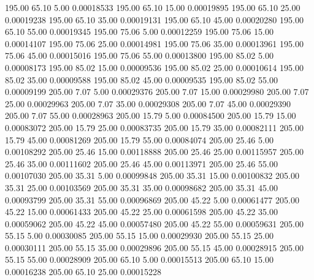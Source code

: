     195.00     65.10      5.00     0.00018533
    195.00     65.10     15.00     0.00019895
    195.00     65.10     25.00     0.00019238
    195.00     65.10     35.00     0.00019131
    195.00     65.10     45.00     0.00020280
    195.00     65.10     55.00     0.00019345
    195.00     75.06      5.00     0.00012259
    195.00     75.06     15.00     0.00014107
    195.00     75.06     25.00     0.00014981
    195.00     75.06     35.00     0.00013961
    195.00     75.06     45.00     0.00015016
    195.00     75.06     55.00     0.00013800
    195.00     85.02      5.00     0.00008173
    195.00     85.02     15.00     0.00009536
    195.00     85.02     25.00     0.00010614
    195.00     85.02     35.00     0.00009588
    195.00     85.02     45.00     0.00009535
    195.00     85.02     55.00     0.00009199
    205.00      7.07      5.00     0.00029376
    205.00      7.07     15.00     0.00029980
    205.00      7.07     25.00     0.00029963
    205.00      7.07     35.00     0.00029308
    205.00      7.07     45.00     0.00029390
    205.00      7.07     55.00     0.00028963
    205.00     15.79      5.00     0.00084500
    205.00     15.79     15.00     0.00083072
    205.00     15.79     25.00     0.00083735
    205.00     15.79     35.00     0.00082111
    205.00     15.79     45.00     0.00081269
    205.00     15.79     55.00     0.00084074
    205.00     25.46      5.00     0.00108292
    205.00     25.46     15.00     0.00118888
    205.00     25.46     25.00     0.00115957
    205.00     25.46     35.00     0.00111602
    205.00     25.46     45.00     0.00113971
    205.00     25.46     55.00     0.00107030
    205.00     35.31      5.00     0.00099848
    205.00     35.31     15.00     0.00100832
    205.00     35.31     25.00     0.00103569
    205.00     35.31     35.00     0.00098682
    205.00     35.31     45.00     0.00093799
    205.00     35.31     55.00     0.00096869
    205.00     45.22      5.00     0.00061477
    205.00     45.22     15.00     0.00061433
    205.00     45.22     25.00     0.00061598
    205.00     45.22     35.00     0.00059062
    205.00     45.22     45.00     0.00057480
    205.00     45.22     55.00     0.00059631
    205.00     55.15      5.00     0.00030085
    205.00     55.15     15.00     0.00029930
    205.00     55.15     25.00     0.00030111
    205.00     55.15     35.00     0.00029896
    205.00     55.15     45.00     0.00028915
    205.00     55.15     55.00     0.00028909
    205.00     65.10      5.00     0.00015513
    205.00     65.10     15.00     0.00016238
    205.00     65.10     25.00     0.00015228
